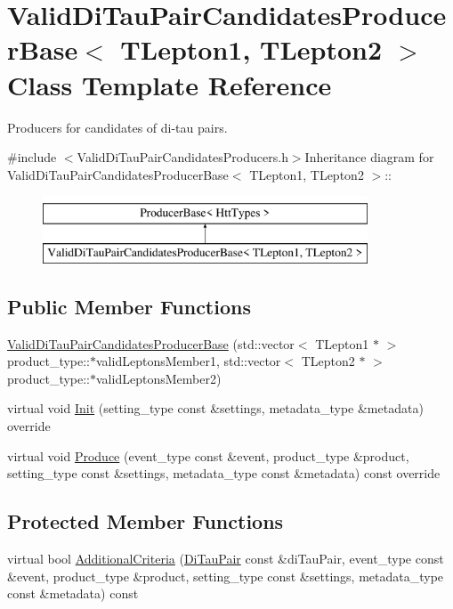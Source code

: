 \hypertarget{classValidDiTauPairCandidatesProducerBase}{
\section{ValidDiTauPairCandidatesProducerBase$<$ TLepton1, TLepton2 $>$ Class Template Reference}
\label{classValidDiTauPairCandidatesProducerBase}
}


Producers for candidates of di-\/tau pairs.  


{\ttfamily \#include $<$ValidDiTauPairCandidatesProducers.h$>$}Inheritance diagram for ValidDiTauPairCandidatesProducerBase$<$ TLepton1, TLepton2 $>$::\begin{figure}[H]
\begin{center}
\leavevmode
\includegraphics[height=2cm]{classValidDiTauPairCandidatesProducerBase}
\end{center}
\end{figure}
\subsection*{Public Member Functions}
\begin{DoxyCompactItemize}
\item 
\hyperlink{classValidDiTauPairCandidatesProducerBase_ab262ca6b1bfefa6899542a50c0bf008e}{ValidDiTauPairCandidatesProducerBase} (std::vector$<$ TLepton1 $\ast$ $>$ product\_\-type::$\ast$validLeptonsMember1, std::vector$<$ TLepton2 $\ast$ $>$ product\_\-type::$\ast$validLeptonsMember2)
\item 
virtual void \hyperlink{classValidDiTauPairCandidatesProducerBase_a981ac448f8ca76e5458fb33e5b50ed32}{Init} (setting\_\-type const \&settings, metadata\_\-type \&metadata) override
\item 
virtual void \hyperlink{classValidDiTauPairCandidatesProducerBase_ae99afcc869a696d8ea6ab910b03fd22b}{Produce} (event\_\-type const \&event, product\_\-type \&product, setting\_\-type const \&settings, metadata\_\-type const \&metadata) const override
\end{DoxyCompactItemize}
\subsection*{Protected Member Functions}
\begin{DoxyCompactItemize}
\item 
virtual bool \hyperlink{classValidDiTauPairCandidatesProducerBase_addca0dffbd06ba4ffb76518f85144e75}{AdditionalCriteria} (\hyperlink{classDiTauPair}{DiTauPair} const \&diTauPair, event\_\-type const \&event, product\_\-type \&product, setting\_\-type const \&settings, metadata\_\-type const \&metadata) const 
\end{DoxyCompactItemize}


